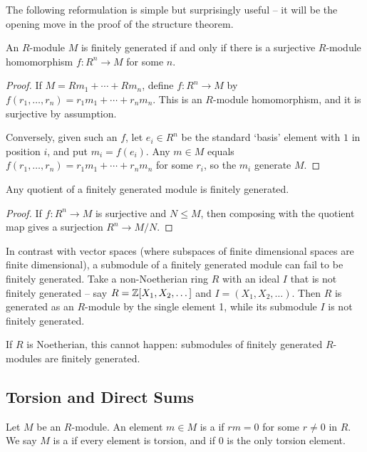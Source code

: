 \documentclass[a4paper]{scrartcl}
\begin{document}
The following reformulation is simple but surprisingly useful -- it will be the opening move in the proof of the structure theorem.

\begin{lemma}
	An $R$-module $M$ is finitely generated if and only if there is a surjective $R$-module homomorphism $f: R^n \rightarrow M$ for some $n$.
\end{lemma}
\begin{proof}
	If $M = Rm_1 + \cdots + Rm_n$, define $f: R^n \rightarrow M$ by $f(r_1, \dots, r_n) = r_1 m_1 + \cdots + r_n m_n$. This is an $R$-module homomorphism, and it is surjective by assumption.

	Conversely, given such an $f$, let $e_i \in R^n$ be the standard `basis' element with $1$ in position $i$, and put $m_i = f(e_i)$. Any $m \in M$ equals $f(r_1, \dots, r_n) = r_1 m_1 + \cdots + r_n m_n$ for some $r_i$, so the $m_i$ generate $M$.
\end{proof}

\begin{corollary}
	Any quotient of a finitely generated module is finitely generated.
\end{corollary}
\begin{proof}
	If $f : R^n \rightarrow M$ is surjective and $N \leq M$, then composing with the quotient map gives a surjection $R^n \rightarrow M/N$.
\end{proof}

\begin{example}
	In contrast with vector spaces (where subspaces of finite dimensional spaces are finite dimensional), a submodule of a finitely generated module can fail to be finitely generated. Take a non-Noetherian ring $R$ with an ideal $I$ that is not finitely generated -- say $R = \mathbb{Z}[X_1, X_2, \dots]$ and $I = (X_1, X_2, \dots)$. Then $R$ is generated as an $R$-module by the single element 1, while its submodule $I$ is not finitely generated.

	If $R$ is Noetherian, this cannot happen: submodules of finitely generated $R$-modules are finitely generated.
\end{example}

\subsection{Torsion and Direct Sums}

\begin{definition}[Torsion]
	Let $M$ be an $R$-module. An element $m \in M$ is a  if $rm = 0$ for some $r \neq 0$ in $R$. We say $M$ is a  if every element is torsion, and  if $0$ is the only torsion element.
\end{definition}
\end{document}
